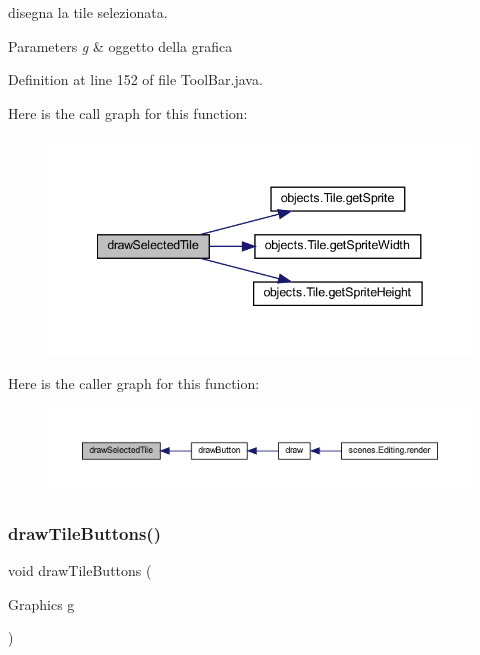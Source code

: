 disegna la tile selezionata. 


\begin{DoxyParams}{Parameters}
{\em g} & oggetto della grafica \\
\hline
\end{DoxyParams}


Definition at line 152 of file Tool\+Bar.\+java.

Here is the call graph for this function\+:\nopagebreak
\begin{figure}[H]
\begin{center}
\leavevmode
\includegraphics[width=342pt]{classui_1_1_tool_bar_aa0f35d91a41dfb53af7bdd7d4a76916f_cgraph}
\end{center}
\end{figure}
Here is the caller graph for this function\+:\nopagebreak
\begin{figure}[H]
\begin{center}
\leavevmode
\includegraphics[width=350pt]{classui_1_1_tool_bar_aa0f35d91a41dfb53af7bdd7d4a76916f_icgraph}
\end{center}
\end{figure}
\mbox{\label{classui_1_1_tool_bar_a55c79e1185fb66ae98edacc2c7d5c302}} 
\subsubsection{\texorpdfstring{draw\+Tile\+Buttons()}{drawTileButtons()}}
{\footnotesize\ttfamily void draw\+Tile\+Buttons (\begin{DoxyParamCaption}\item[{Graphics}]{g }\end{DoxyParamCaption})}



